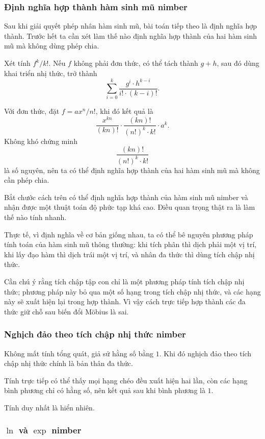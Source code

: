 \documentclass[11pt]{article}
\begin{document}
\subsubsection{Định nghĩa hợp thành hàm sinh mũ nimber}

Sau khi giải quyết phép nhân hàm sinh mũ, bài toán tiếp theo là định nghĩa hợp
thành. Trước hết ta cần xét làm thế nào định nghĩa hợp thành của hai hàm sinh
mũ mà không dùng phép chia.

Xét tính \(f^k/k!\). Nếu \(f\) không phải đơn thức, có thể tách thành \(g+h\),
sau đó dùng khai triển nhị thức, trở thành
\[
  \sum_{i=0}^k \frac{g^i\cdot h^{k-i}}{i!\cdot(k-i)!}.
\]

Với đơn thức, đặt \(f=ax^n/n!\), khi đó kết quả là
\[
  \frac{x^{kn}}{(kn)!}\cdot \frac{(kn)!}{(n!)^k\cdot k!}\cdot a^k.
\]
Không khó chứng minh
\[
  \frac{(kn)!}{(n!)^k\cdot k!}
\]
là số nguyên, nên ta có thể định nghĩa hợp thành của hai hàm sinh mũ mà không
cần phép chia.

Bắt chước cách trên có thể định nghĩa hợp thành của hàm sinh mũ nimber và nhận
được một thuật toán độ phức tạp khá cao. Điều quan trọng thật ra là làm thế nào
tính nhanh.

Thực tế, vì định nghĩa về cơ bản giống nhau, ta có thể bê nguyên phương pháp
tính toán của hàm sinh mũ thông thường: khi tích phân thì dịch phải một vị trí,
khi lấy đạo hàm thì dịch trái một vị trí, và nhân đa thức thì dùng tích chập
nhị thức.

Cần chú ý rằng tích chập tập con chỉ là một phương pháp tính tích chập nhị thức;
phương pháp này bỏ qua một số hạng trong tích chập nhị thức, và các hạng này sẽ
xuất hiện lại trong hợp thành. Vì vậy cách trực tiếp hợp thành các đa thức giữ
chỗ sau biến đổi Möbius là sai.

\subsubsection{Nghịch đảo theo tích chập nhị thức nimber}

Không mất tính tổng quát, giả sử hằng số bằng \(1\). Khi đó nghịch đảo theo tích
chập nhị thức chính là bản thân đa thức.

Tính trực tiếp có thể thấy mọi hạng chéo đều xuất hiện hai lần, còn các hạng
bình phương chỉ có hằng số, nên kết quả sau khi bình phương là \(1\).

Tính duy nhất là hiển nhiên.

\subsubsection{\texorpdfstring{\(\ln\)}{ln} và \texorpdfstring{\(\exp\)}{exp} nimber}
\end{document}
